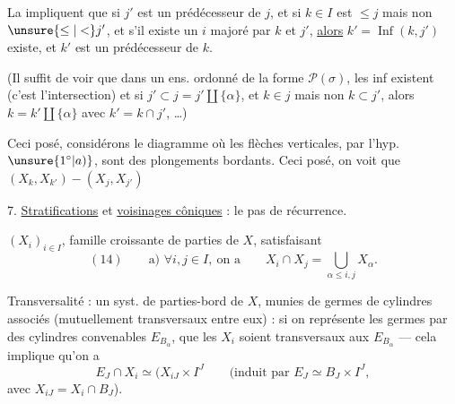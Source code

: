 La  impliquent que si $j'$ est
un prédécesseur de $j$, et si $k\in I$ est $\le j$
mais non $\unsure{\le|<}j'$, et s'il existe
un $i$ majoré par $k$ et $j'$, \uline{alors}
$k'=\operatorname{Inf}(k,j')$ existe, et $k'$ est
un prédécesseur de $k$.


(Il suffit de voir que dans
un ens. ordonné de la forme $\mathcal P(\sigma)$,
les inf existent (c'est l'intersection) et si
$j'\subset j=j'\amalg\{\alpha\}$, et $k\in j$ mais non $k\subset j'$,
alors  $k=k'\amalg\{\alpha\}$ avec $k'=k\cap j'$, \ldots)

Ceci posé, considérons le diagramme
où les flèches verticales, par l'hyp. $\unsure{1^\circ|a)}$,
sont des plongements bordants. Ceci posé, on
voit  que 
$(X_k,X_{k'})\mathbin{-}(X_j,X_{j'})$

7. \uline{Stratifications} et \uline{voisinages côniques} : le pas
de récurrence.

$(X_i)_{i\in I}$, famille croissante de parties de $X$,
satisfaisant
\[
(14)\qquad\text{a) }\forall i,j\in I,\ \text{on a}\qquad
X_i\cap X_j=\bigcup_{\alpha\le i,j}X_\alpha.
\]


Transversalité : un syst. de parties-bord  de
$X$, munies de germes de cylindres associés
(mutuellement transversaux entre eux) : si on
représente les germes par des cylindres convenables
$E_{B_\alpha}$,  que les $X_i$ soient transversaux
aux $E_{B_\alpha}$ --- cela implique qu'on a
\[
E_J\cap X_i\simeq (X_{iJ}\times I^J
\qquad
\text{(induit par }E_J\simeq B_J\times I^J,
\]
avec $X_{iJ}=X_i\cap B_J$).

